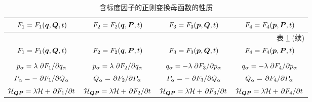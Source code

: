 \begin{longtable}[c]{cccc}
    \caption{含标度因子的正则变换母函数的性质 \label{含标度因子的正则变换母函数的性质}}\\
    \toprule $ F_1=F_1(\vb*{q},\vb*{Q},t) $ & $ F_2=F_2(\vb*{q},\vb*{P},t) $ & $ F_3=F_3(\vb*{p},\vb*{Q},t) $ & $ F_4=F_4(\vb*{p},\vb*{P},t) $ \\
    \midrule\endfirsthead\multicolumn{4}{r}{\small 表 \ref{含标度因子的正则变换母函数的性质} (续)} \\
    \toprule $ F_1=F_1(\vb*{q},\vb*{Q},t) $ & $ F_2=F_2(\vb*{q},\vb*{P},t) $ & $ F_3=F_3(\vb*{p},\vb*{Q},t) $ & $ F_4=F_4(\vb*{p},\vb*{P},t) $ \\ \\
    \midrule\endhead \bottomrule \endfoot \bottomrule \endlastfoot
    $ p_{\alpha}=\lambda\pdv*{F_1}{q_{\alpha}} $ & $ p_{\alpha}=\lambda\pdv*{F_2}{q_{\alpha}} $ & $ q_{\alpha}=-\lambda\pdv*{F_3}{p_{\alpha}} $ & $ q_{\alpha}=-\lambda\pdv*{F_4}{p_{\alpha}} $ \\
    $ P_{\alpha}=-\pdv*{F_1}{Q_{\alpha}} $ & $ Q_{\alpha}=\pdv*{F_2}{P_{\alpha}} $ & $ P_{\alpha}=-\pdv*{F_3}{Q_{\alpha}} $ & $ Q_{\alpha}=\pdv*{F_4}{P_{\alpha}} $ \\
    $ \mathcal{H}_{\vb*{Q}\vb*{P}}=\lambda\mathcal{H}+\pdv*{F_1}{t} $ & $ \mathcal{H}_{\vb*{Q}\vb*{P}}=\lambda\mathcal{H}+\pdv*{F_2}{t} $ & $ \mathcal{H}_{\vb*{Q}\vb*{P}}=\lambda\mathcal{H}+\pdv*{F_3}{t} $ & $ \mathcal{H}_{\vb*{Q}\vb*{P}}=\lambda\mathcal{H}+\pdv*{F_4}{t} $
\end{longtable}

